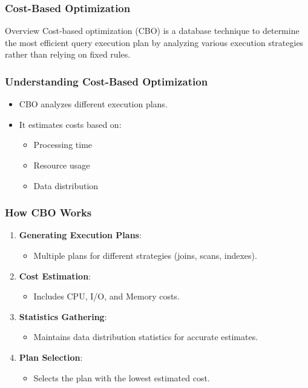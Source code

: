\documentclass[aspectratio=169]{beamer}
\begin{document}
\begin{frame}[fragile]
    \frametitle{Cost-Based Optimization}
    
    \begin{block}{Overview}
        Cost-based optimization (CBO) is a database technique to determine the most efficient query execution plan by analyzing various execution strategies rather than relying on fixed rules.
    \end{block}
\end{frame}

\begin{frame}[fragile]
    \frametitle{Understanding Cost-Based Optimization}
    
    \begin{itemize}
        \item CBO analyzes different execution plans.
        \item It estimates costs based on:
        \begin{itemize}
            \item Processing time
            \item Resource usage
            \item Data distribution
        \end{itemize}
    \end{itemize}
\end{frame}

\begin{frame}[fragile]
    \frametitle{How CBO Works}
    
    \begin{enumerate}
        \item \textbf{Generating Execution Plans}:
            \begin{itemize}
                \item Multiple plans for different strategies (joins, scans, indexes).
            \end{itemize}
        
        \item \textbf{Cost Estimation}:
            \begin{itemize}
                \item Includes CPU, I/O, and Memory costs.
            \end{itemize}
        
        \item \textbf{Statistics Gathering}:
            \begin{itemize}
                \item Maintains data distribution statistics for accurate estimates.
            \end{itemize}
        
        \item \textbf{Plan Selection}:
            \begin{itemize}
                \item Selects the plan with the lowest estimated cost.
            \end{itemize}
    \end{enumerate}
\end{frame}
\end{document}
